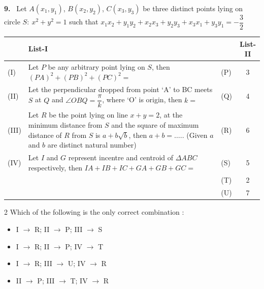 \documentclass[10pt]{extarticle}
\newcommand{\qn}[1]{\par\smallskip\noindent\textbf{#1.}~}
\newenvironment{qoptions}{\begin{itemize}[leftmargin=1.8em,itemsep=1pt,topsep=2pt,label={}]}{\end{itemize}}
\newcommand{\opt}[2]{\item[(#1)] #2}
\begin{document}
\noindent\begin{minipage}{\textwidth}
\qn{9} Let $A(x_1,y_1)$, $B(x_2,y_2)$, $C(x_3,y_3)$ be three distinct points lying on circle $S:\ x^2+y^2=1$ such that $x_1x_2+y_1y_2+x_2x_3+y_2y_3+x_3x_1+y_3y_1=-\dfrac32$\par\smallskip
\begin{center}\small\renewcommand{\arraystretch}{1.25}\setlength{\tabcolsep}{4pt}
\begin{tabular}{|l|p{10.5cm}|l|c|}
\hline & \textbf{List-I} & & \textbf{List-II} \\\hline
(I) & Let $P$ be any arbitrary point lying on $S$, then $(PA)^2+(PB)^2+(PC)^2=$ & (P) & 3 \\\hline
(II) & Let the perpendicular dropped from point `A' to BC meets $S$ at $Q$ and $\angle OBQ=\dfrac{\pi}{k}$, where `O' is origin, then $k=$ & (Q) & 4 \\\hline
(III) & Let $R$ be the point lying on line $x+y=2$, at the minimum distance from $S$ and the square of maximum distance of $R$ from $S$ is $a+b\sqrt b$, then $a+b=\ldots..$ (Given $a$ and $b$ are distinct natural number) & (R) & 6 \\\hline
(IV) & Let $I$ and $G$ represent incentre and centroid of $\Delta ABC$ respectively, then $IA+IB+IC+GA+GB+GC=$ & (S) & 5 \\\hline
 &  & (T) & 2 \\\hline
 &  & (U) & 7 \\\hline
\end{tabular}
\end{center}
\end{minipage}
\begin{multicols}{2}
Which of the following is the only correct combination :
\begin{qoptions}
\opt{A}{I $\to$ R; II $\to$ P; III $\to$ S}
\opt{B}{I $\to$ R; II $\to$ P; IV $\to$ T}
\opt{C}{I $\to$ R; III $\to$ U; IV $\to$ R}
\opt{D}{II $\to$ P; III $\to$ T; IV $\to$ R}
\end{qoptions}
\end{multicols}
\end{document}
